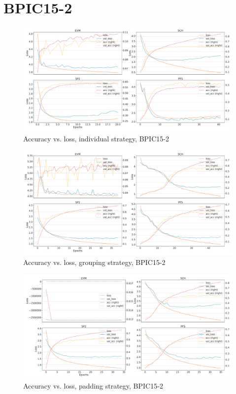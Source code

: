 \section*{BPIC15-2}
\begin{figure}[!htb]
    \centering
    \includegraphics[width=\textwidth]{gfx/bpic2015_2/individual_loss_acc_curve.pdf}
    \caption{Accuracy vs. loss, individual strategy, BPIC15-2}
\end{figure}
\begin{figure}[!htb]
    \centering
    \includegraphics[width=\textwidth]{gfx/bpic2015_2/grouped_loss_acc_curve.pdf}
    \caption{Accuracy vs. loss, grouping strategy, BPIC15-2}
\end{figure}
\begin{figure}[!htb]
    \centering
    \includegraphics[width=\textwidth]{gfx/bpic2015_2/padded_loss_acc_curve.pdf}
    \caption{Accuracy vs. loss, padding strategy, BPIC15-2}
\end{figure}
